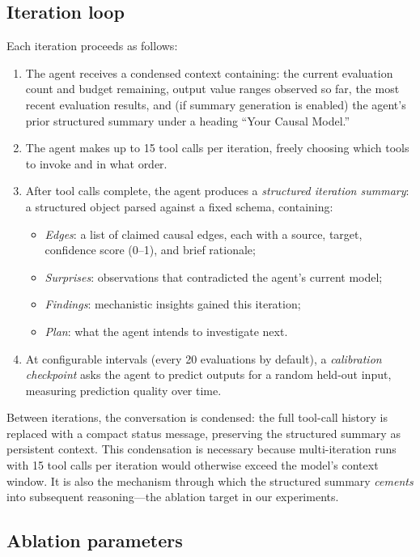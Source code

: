 \documentclass[11pt,letterpaper]{article}
\begin{document}
\subsection{Iteration loop}

Each iteration proceeds as follows:

\begin{enumerate}
  \item The agent receives a condensed context containing: the current
  evaluation count and budget remaining, output value ranges observed so
  far, the most recent evaluation results, and (if
  summary generation is enabled) the agent's prior
  structured summary under a heading ``Your Causal Model.''
  \item The agent makes up to 15 tool calls per iteration, freely
  choosing which tools to invoke and in what order.
  \item After tool calls complete, the agent produces a \emph{structured
  iteration summary}: a structured object parsed against a fixed schema,
  containing:
  \begin{itemize}
    \item \emph{Edges}: a list of claimed causal edges, each with a
    source, target, confidence score (0--1), and brief rationale;
    \item \emph{Surprises}: observations that contradicted the agent's
    current model;
    \item \emph{Findings}: mechanistic insights gained this iteration;
    \item \emph{Plan}: what the agent intends to investigate next.
  \end{itemize}
  \item At configurable intervals (every 20 evaluations by default), a
  \emph{calibration checkpoint} asks the agent to predict outputs for a
  random held-out input, measuring prediction quality over time.
\end{enumerate}

Between iterations, the conversation is condensed: the full tool-call
history is replaced with a compact status message, preserving the
structured summary as persistent context. This condensation is necessary
because multi-iteration runs with 15 tool calls per iteration would
otherwise exceed the model's context window. It is also the mechanism
through which the structured summary \emph{cements} into subsequent
reasoning---the ablation target in our experiments.

\subsection{Ablation parameters}
\end{document}
